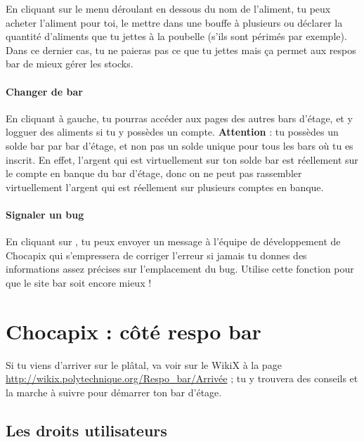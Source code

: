 \documentclass[12pt,french]{article}
\begin{document}
En cliquant sur le menu déroulant en dessous du nom de l'aliment, tu peux acheter l'aliment pour toi, le mettre dans une bouffe à plusieurs ou déclarer la quantité d'aliments que tu jettes à la poubelle (s'ils sont périmés par exemple). Dans ce dernier cas, tu ne paieras pas ce que tu jettes mais ça permet aux respos bar de mieux gérer les stocks.

\paragraph{Changer de bar} En cliquant  à gauche, tu pourras accéder aux pages des autres bars d'étage, et y logguer des aliments si tu y possèdes un compte. \textbf{Attention} : tu possèdes un solde bar par bar d'étage, et non pas un solde unique pour tous les bars où tu es inscrit. En effet, l'argent qui est virtuellement sur ton solde bar est réellement sur le compte en banque du bar d'étage, donc on ne peut pas rassembler virtuellement l'argent qui est réellement sur plusieurs comptes en banque.

\paragraph{Signaler un bug} En cliquant sur , tu peux envoyer un message à l'équipe de développement de Chocapix qui s'empressera de corriger l'erreur si jamais tu donnes des informations assez précises sur l'emplacement du bug. Utilise cette fonction pour que le site bar soit encore mieux !


\section{Chocapix : côté respo bar}

Si tu viens d'arriver sur le plâtal, va voir sur le WikiX à la page \url{http://wikix.polytechnique.org/Respo_bar/Arrivée} ; tu y trouvera des conseils et la marche à suivre pour démarrer ton bar d'étage.

\subsection{Les droits utilisateurs}
\end{document}
